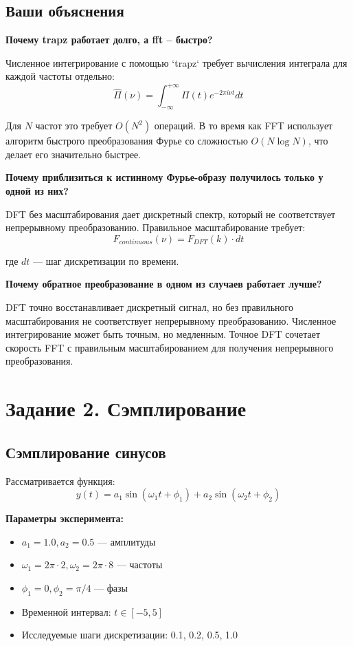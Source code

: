 \subsection*{Ваши объяснения}

\textbf{Почему trapz работает долго, а fft – быстро?}

Численное интегрирование с помощью `trapz` требует вычисления интеграла для каждой частоты отдельно:
\begin{equation}
\hat{\Pi}(\nu) = \int_{-\infty}^{+\infty} \Pi(t) e^{-2\pi i \nu t} dt
\end{equation}

Для $N$ частот это требует $O(N^2)$ операций. В то время как FFT использует алгоритм быстрого преобразования Фурье со сложностью $O(N \log N)$, что делает его значительно быстрее.

\textbf{Почему приблизиться к истинному Фурье-образу получилось только у одной из них?}

DFT без масштабирования дает дискретный спектр, который не соответствует непрерывному преобразованию. Правильное масштабирование требует:
\begin{equation}
F_{continuous}(\nu) = F_{DFT}(k) \cdot dt
\end{equation}

где $dt$ — шаг дискретизации по времени.

\textbf{Почему обратное преобразование в одном из случаев работает лучше?}

DFT точно восстанавливает дискретный сигнал, но без правильного масштабирования не соответствует непрерывному преобразованию. Численное интегрирование может быть точным, но медленным. Точное DFT сочетает скорость FFT с правильным масштабированием для получения непрерывного преобразования.

\section*{Задание 2. Сэмплирование}

\subsection*{Сэмплирование синусов}

Рассматривается функция:
\begin{equation}
y(t) = a_1 \sin(\omega_1 t + \phi_1) + a_2 \sin(\omega_2 t + \phi_2)
\end{equation}

\textbf{Параметры эксперимента:}
\begin{itemize}
    \item $a_1 = 1.0, a_2 = 0.5$ — амплитуды
    \item $\omega_1 = 2\pi \cdot 2, \omega_2 = 2\pi \cdot 8$ — частоты
    \item $\phi_1 = 0, \phi_2 = \pi/4$ — фазы
    \item Временной интервал: $t \in [-5, 5]$
    \item Исследуемые шаги дискретизации: 0.1, 0.2, 0.5, 1.0
\end{itemize}

